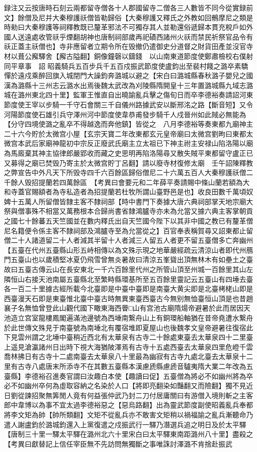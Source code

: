 録注又云按唐時石刻云兩都留寺僧各十人郡國留寺二僧各三人數皆不同今從實録前文】餘僧及尼并大秦穆護祅僧皆勒歸俗【大秦穆護又釋氏之外教如回鶻摩尼之類是時勑曰大秦穆護等祠釋教既已釐革邪法不可獨存其人並勒還俗遞歸本貫充稅戶如外國人送遠處收管祅乎煙翻胡神也唐制祠部歲再祀磧西諸州火祅而禁民祈祭官品令有祅正蓋主祅僧也】寺非應留者立期令所在毁撤仍遣御史分道督之財貨田產並沒官寺材以葺公廨驛舍【廨古隘翻】銅像鐘磬以鑄錢　以山南東道節度使鄭肅檢校右僕射同平章事　詔昭義騎兵五百步兵千五百戍振武節度使盧鈞出至裴村餞之潞卒素驕憚於遠戍乘醉回旗入城閉門大譟鈞奔潞城以避之【宋白曰潞城縣春秋潞子嬰兒之國漢為潞縣十三州志云潞水出焉後魏太武改為刈陵縣隋開皇十三年置潞城縣九域志潞城在潞州東北四十里】監軍王惟直自出曉諭亂兵擊之傷旬日而卒李德裕奏請詔河東節度使王宰以步騎一千守石會關三千自儀州路據武安以斷邢洺之路【斷音短】又令河陽節度使石雄引兵守澤州河中節度使韋恭甫發步騎千人戍晉州如此賊必無能為【分守四境使潞之亂卒不得越逸而奔他鎮】皆從之　八月李德裕等奏東都九廟神主二十六今貯於太微宫小屋【玄宗天寶二年改東都玄元皇帝廟曰太微宫劉昫曰東都太微宫本武后家廟神龍初中宗反正廢武氏廟主立太祖已下神主祔主安禄山陷洛陽以廟為馬廄棄其神主協律郎嚴郢收而藏之史思明再陷洛陽尋又散失賊平東都留守盧正已又募得之廟已焚毁乃寄主於太微宫貯丁呂翻】請以廢寺材復修太廟　壬午詔陳釋教之弊宣告中外凡天下所毁寺四千六百餘區歸俗僧尼二十六萬五百人大秦穆護祅僧二千餘人毁招提蘭若四萬餘區　【考異曰會要元和二年薛平奏請賜中條山蘭若額為大和寺蓋官賜額者為寺私造者為招提蘭若杜牧所謂山臺野邑是也】收良田數千萬頃奴婢十五萬人所留僧皆隸主客不隸祠部【時中書門下奏據大唐六典祠部掌天地宗廟大祭與僧事殊不相當又萬務根本合歸尚書省隸鴻臚寺亦未為允當又據六典主客掌朝貢之國七十餘蕃五天竺國並在數内釋氏出自天竺國今陛下以其非中國之教已有釐革僧尼名籍便令係主客不隸祠部及鴻臚寺至為允當從之】百官奉表稱賀尋又詔東都止留僧二十人諸道留二十人者減其半留十人者減三人留五人者更不留五臺僧多亡奔幽州【五臺在代州五臺縣山形五峙相傳以為文殊示現之地華嚴經疏云清涼山者即代州鴈門五臺山也以歲積堅冰夏仍飛雪曾無炎暑故曰清涼五峯聳出頂無林木有如壘土之臺故曰五臺古傳云山在長安東北一千六百餘里代州之所管山頂至州城一百餘里其山左隣恒山右接天池南屬五臺縣北至繁畤縣環基所至五百餘里靈記云五臺山有四埵去臺各一百二十里據古經所載今北臺即是中臺中臺即是南臺大黄尖即是北臺栲栳山即是西臺漫天石即是東臺惟北臺中臺古時無異東臺西臺古今無别無恤臺恒山頂是也昔趙襄子名無恤曾登此山觀代國下瞰東海西瞢□山有宫池古廟隋煬帝避暑於此而居因天池造立宫室龍樓鳳閣遍滿池邊號為西埵南繋舟山上有銅環船軸猶在昔帝堯遭水繋舟於此世傳文殊見于南臺號為南埵北有覆宿堆即夏屋山也後魏孝文皇帝避暑往復宿此下見雲州謂之北埵中臺稍近西北有太華泉有古寺二十餘處東臺去太華泉四十二里臺上遥見滄瀛諸州日出時下視大海猶陂澤焉有古寺十五處西臺去太華泉四里危嶝千雲喬林拂日有古寺十二處南臺去太華泉八十里最為幽寂有古寺九處北臺去太華泉十二里有古寺八處唐末所添寺不在其數五臺縣本漢慮虒縣慮虒音驢夷隋大業二年改為五臺縣】李德裕召進奏官謂曰汝趣白本使【趣讀曰促】五臺僧為將必不如幽州將為卒必不如幽州卒何為虛取容納之名染於人口【將即亮翻染如豔翻又而險翻】獨不見近日劉從諫招聚無筭閒人竟有何益張仲武乃封二刀付居庸關曰有游僧入境則斬之主客郎中韋博以為事不宜太過李德裕惡之【惡烏路翻】出為靈武節度副使昭義亂兵奉都將李文矩為帥【帥所類翻】文矩不從亂兵亦不敢害文矩稍以禍福諭之亂兵漸聽命乃遣人謝盧鈞於潞城鈞還入上黨復遣之戍振武行一驛乃潛選兵追之明日及於太平驛【唐制三十里一驛太平驛在潞州北六十里宋白曰太平驛東南距潞州八十里】盡殺之　【考異曰獻替記上信任宰臣無不先訪問無獨斷之事唯誅討澤潞不肯捨赴振武